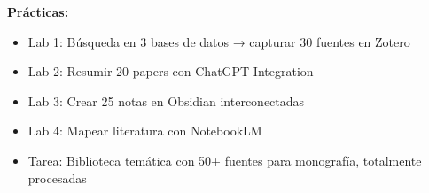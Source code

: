 \documentclass[12pt,a4paper]{yaac-luatex}
\begin{document}
\begin{tcolorbox}[
		enhanced,
		colback=white,
		colframe=curso3color,
		arc=3pt,
		boxrule=1.5pt,
		left=10pt,
		right=10pt,
		top=8pt,
		bottom=8pt,
		breakable
		]
		\textbf{Prácticas:}
		\begin{itemize}[leftmargin=*, itemsep=0.1cm]
			\item Lab 1: Búsqueda en 3 bases de datos → capturar 30 fuentes en Zotero
			\item Lab 2: Resumir 20 papers con ChatGPT Integration
			\item Lab 3: Crear 25 notas en Obsidian interconectadas
			\item Lab 4: Mapear literatura con NotebookLM
			\item Tarea: Biblioteca temática con 50+ fuentes para monografía, totalmente procesadas
		\end{itemize}
	\end{tcolorbox}
	
	\vspace{0.3cm}
	
\end{document}
